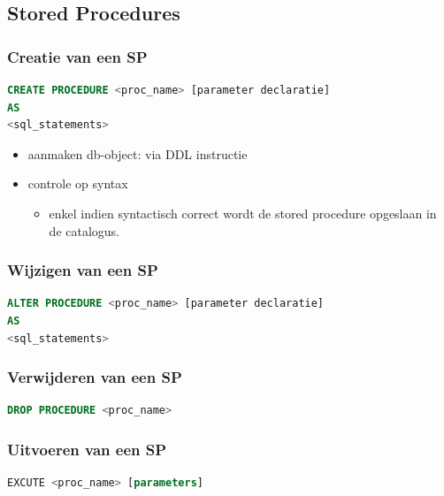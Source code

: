 \documentclass[a4paper,12pt]{article}
\begin{document}
\subsection{Stored Procedures}
\subsubsection{Creatie van een SP}
\begin{lstlisting}[language=sql, breaklines=true]
CREATE PROCEDURE <proc_name> [parameter declaratie]
AS
<sql_statements>
\end{lstlisting}
\begin{itemize}
\item aanmaken db-object: via DDL instructie
\item controle op syntax
	\begin{itemize}
	\item enkel indien syntactisch correct wordt de stored procedure opgeslaan in de catalogus.
	\end{itemize}
\end{itemize}

\subsubsection{Wijzigen van een SP}
\begin{lstlisting}[language=sql, breaklines=true]
ALTER PROCEDURE <proc_name> [parameter declaratie]
AS
<sql_statements>
\end{lstlisting}

\subsubsection{Verwijderen van een SP}
\begin{lstlisting}[language=sql, breaklines=true]
DROP PROCEDURE <proc_name>
\end{lstlisting}

\subsubsection{Uitvoeren van een SP}
\begin{lstlisting}[language=sql, breaklines=true]
EXCUTE <proc_name> [parameters]
\end{lstlisting}
\end{document}

